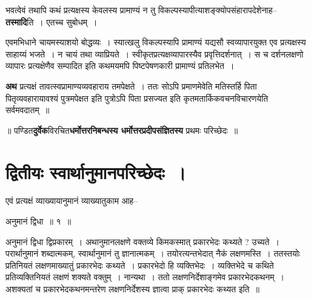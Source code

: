 \documentclass[article,12pt,a4paper]{memoir}
\begin{document}
	  \pstart भवत्वेवं तथापि कथं प्रत्यक्षस्य केवलस्य प्रामाण्यं न तु विकल्पस्यापीत्याशङ्क्योपसंहारापदेशेनाह--\textbf{तस्मादि}ति । एतच्च सुबोधम् ।
	\pend
      

	  \pstart एवमभिधाने चायमस्याशयो बोद्धव्यः । स्यात्खलु विकल्पस्यापि प्रामाण्यं यद्यसौ स्वव्यापारयुक्त एव प्रत्यक्षस्य साहाय्यं भजते । न चायं तथा व्याप्रियते । स्वीकृतप्रत्यक्षव्यापारस्यैव प्रवृत्तिदर्शनात् । स च दर्शनलक्षणो व्यापारः प्रत्यक्षेणैव सम्पादित इति कथमयमपि पिष्टपेषणकारी प्रामाण्यं प्रतिलभेत ।
	\pend
      

	  \pstart \textbf{अथ} प्रत्यक्षं तावत्स्वप्रामाण्यव्यव\leavevmode{}हाराय तमपेक्षते । ततः सोऽपि प्रमाणमेवेति मतिस्तर्हि पिता पितृव्यवहारायावश्यं पुत्रमपेक्षत इति पुत्रोऽपि पिता प्रसज्यत इति कृतमतार्किकवचनविचारणयेति सर्वमवदातम् ॥
	\pend
      

	  \pstart ॥ पण्डित\textbf{दुर्वेक}विरचित\textbf{धर्मोत्तरनिबन्धस्य धर्मोत्तरप्रदीपसंज्ञितस्य} प्रथमः परिच्छेदः ॥
	\pend
      
	    
	    \endnumbering%
	    \endgroup
	    
	  
	  
	
	    
	    \begingroup
	    \beginnumbering%
	    
	  
\chapter[{द्वितीयः स्वार्थानुमानपरिच्छेदः ।}]{द्वितीयः स्वार्थानुमानपरिच्छेदः ।}
	  \bigskip
	  \begingroup
	

	  \pstart एवं प्रत्यक्षं व्याख्यायानुमानं व्याख्यातुकाम आह--
	\pend
        
	  \bigskip
	  \begingroup
	

	  \pstart अनुमानं द्विधा ॥ १ ॥
	\pend
      
	  \endgroup
	 

	  \pstart अनुमानं द्विधा द्विप्रकारम् । अथानुमानलक्षणे वक्तव्ये किमकस्मात् प्रकारभेदः कथ्यते ? उच्यते । परार्थानुमानं शब्दात्मकम्, स्वार्थानुमानं तु ज्ञानात्मकम् । तयोरत्यन्तभेदात् नैकं लक्षणमस्ति । ततस्तयोः प्रतिनियतं लक्षणमाख्यातुं प्रकारभेदः कथ्यते । प्रकारभेदो हि व्यक्तिभेदः । व्यक्तिभेदे च कथिते प्रतिव्यक्तिनियतं लक्षणं शक्यते वक्तुम् । नान्यथा । ततो लक्षणनिर्देशाङ्गमेव प्रकारभेदकथनम् । अशक्यतां च प्रकारभेदकथनमन्तरेण लक्षणनिर्देशस्य ज्ञात्वा प्राक् प्रकारभेदः कथ्यत इति ॥
	\pend
      
\end{document}
